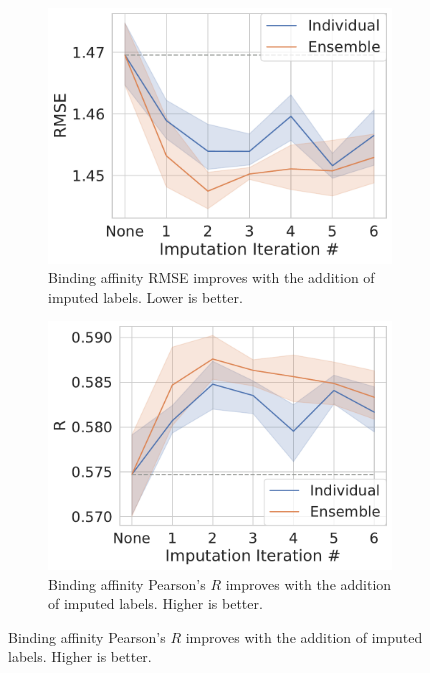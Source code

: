 \documentclass[journal=jcim,manuscript=article]{achemso}
\begin{document}
\begin{figure}[tbph]
    \centering
    \begin{subfigure}[t]{0.48\textwidth}
        \centering
        \includegraphics[width=\linewidth]{figures/InitialImpRMSE.pdf}
        \caption{Binding affinity RMSE improves with the addition of imputed labels. Lower is better.}
    \end{subfigure}
    \hfill
    \begin{subfigure}[t]{0.48\textwidth}
        \centering
        \includegraphics[width=\linewidth]{figures/InitialImpR.pdf}
        \caption{Binding affinity Pearson's $R$ improves with the addition of imputed labels. Higher is better.}
    \end{subfigure}


\end{figure}
\end{document}
